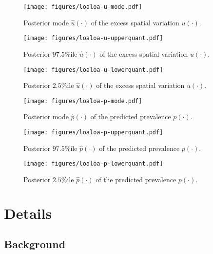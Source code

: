 \documentclass[12pt]{article}
\newcommand{\plotwidth}{6in}
\newcommand{\plotheight}{3in}
\begin{document}
\begin{figure}
  \centering
  \texttt{[image: figures/loaloa-u-mode.pdf]}
  \caption{Posterior mode $\widehat{u}(\cdot)$ of the excess spatial variation $u(\cdot)$.}
  \label{fig:loaloaumode}
\end{figure}

\begin{figure}
  \centering
  \texttt{[image: figures/loaloa-u-upperquant.pdf]}
  \caption{Posterior $97.5\%$ile $\widehat{u}(\cdot)$ of the excess spatial variation $u(\cdot)$.}
  \label{fig:loaloauupper}
\end{figure}

\begin{figure}
  \centering
  \texttt{[image: figures/loaloa-u-lowerquant.pdf]}
  \caption{Posterior $2.5\%$ile $\widehat{u}(\cdot)$ of the excess spatial variation $u(\cdot)$.}
  \label{fig:loaloaulower}
\end{figure}

\begin{figure}
  \centering
  \texttt{[image: figures/loaloa-p-mode.pdf]}
  \caption{Posterior mode $\widehat{p}(\cdot)$ of the predicted prevalence $p(\cdot)$.}
  \label{fig:loaloapmode}
\end{figure}

\begin{figure}
  \centering
  \texttt{[image: figures/loaloa-p-upperquant.pdf]}
  \caption{Posterior $97.5\%$ile $\widehat{p}(\cdot)$ of the predicted prevalence $p(\cdot)$.}
  \label{fig:loaloapupper}
\end{figure}

\begin{figure}
  \centering
  \texttt{[image: figures/loaloa-p-lowerquant.pdf]}
  \caption{Posterior $2.5\%$ile $\widehat{p}(\cdot)$ of the predicted prevalence $p(\cdot)$.}
  \label{fig:loaloaplower}
\end{figure}

\section{Details}

\subsection{Background}
\end{document}
